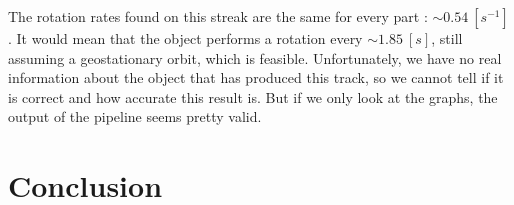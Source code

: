 \documentclass[a4paper,12pt,oneside]{report}
\begin{document}
\newline
\newline
\newline
\newline
\newline
\newline
\newline
\newline
\newline
\newline
\newline
\newline
\newline
\newline
\newline
\newline
\newline
\newline
\newline
The rotation rates found on this streak are the same for every part : $\sim 0.54\ [s^{-1}]$. It would mean that the object performs a rotation
every $\sim 1.85\ [s]$, still assuming a geostationary orbit, which is feasible. Unfortunately, we have no real information about the object 
that has produced this track, so we cannot tell if it is correct and how accurate this result is. But if we only look at the graphs, 
the output of the pipeline seems pretty valid. 


\chapter{Conclusion}
\end{document}
